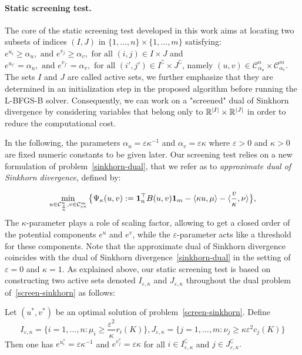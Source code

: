 \paragraph{Static screening test.} The core of the static screening test developed in this work aims at locating two subsets of indices $(I, J)$ in $\{1, \ldots, n\}\times\{1, \ldots, m\}$ satisfying: $e^{u_i}\geq \alpha_u, \text{ and } e^{v_j}\geq \alpha_v, \text{ for all } (i,j) \in I \times J$ and 
$e^{u_{i'}} = \alpha_u, \text{ and } e^{v_{j'}} = \alpha_v, \text{ for all } (i',j') \in I^\complement \times J^\complement$, namely $(u,v) \in \mathcal{C}^n_{\alpha_u}\times \mathcal{C}^m_{\alpha_v}$.
The sets $I$ and $J$ are called active sets, we further emphasize that they are determined in an initialization step in the proposed algorithm before running the L-BFGS-B solver.
Consequently, we can work on a "screened" dual of Sinkhorn divergence by considering variables that belong only to ${\mathbb{R}}^{|I|} \times {\mathbb{R}}^{|J|}$ in order to reduce the computational cost.

In the following, the parameters $\alpha_u = \varepsilon \kappa^{-1}$ and $\alpha_v = \varepsilon \kappa$ where $\varepsilon > 0$ and $\kappa > 0$ are fixed numeric constants to be given later. 
Our screening test relies on a new formulation of problem~\eqref{sinkhorn-dual}, that we refer as to \emph{approximate dual of Sinkhorn divergence}, defined by:

\begin{equation} 
\label{screen-sinkhorn}
\min_{u \in \mathcal{C}^n_{\frac \varepsilon \kappa}, v\in \mathcal{C}^m_{\varepsilon\kappa}} \big\{\Psi_{\kappa}(u,v):= \mathbf{1}_n^\top B(u,v)\mathbf{1}_m - \langle \kappa u, \mu \rangle - \langle \frac v\kappa, \nu \rangle \big\},
\end{equation}
The $\kappa$-parameter plays a role of scaling factor, allowing to get a closed order of the potential components $e^u$ and $e^v$, while the $\varepsilon$-parameter acts like a threshold for these components.
Note that the approximate dual of Sinkhorn divergence coincides with the dual of Sinkhorn divergence~\eqref{sinkhorn-dual} in the setting of $\varepsilon=0$ and $\kappa=1$.
As explained above, our static screening test is based on constructing two {active sets} denoted $I_{\varepsilon, \kappa}$ and $J_{\varepsilon, \kappa}$ throughout the dual problem of~\eqref{screen-sinkhorn} as follows: 

\begin{lemma}
\label{lemma_actives_sets}
Let $(u^{*}, v^{*})$ be an optimal solution of problem~\eqref{screen-sinkhorn}. 
Define
\begin{equation}
\label{I_epsilon_kappa_J_epsilon_kappa}
I_{\varepsilon,\kappa} = \big\{i=1, \ldots, n: \mu_i \geq \frac {\varepsilon^2} \kappa^{} r_i(K)\big\}, J_{\varepsilon,\kappa} = \big\{j=1, \ldots, m: \nu_j \geq \kappa{\varepsilon^2}{} c_j(K)\big\}
\end{equation}
Then one has $e^{u^{*}_i} = \varepsilon\kappa^{-1}$ and $e^{v^{*}_j} = \varepsilon\kappa$ for all $i \in I^\complement_{\varepsilon,\kappa} $ and $j\in J^\complement_{\varepsilon,\kappa} .$
\end{lemma}

